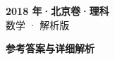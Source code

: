 \documentclass[zihao=-4, a4paper]{ctexart}
\begin{document}
\begin{center}
  {\Large\bfseries 2018 年·北京卷·理科}\\[4pt]
  {\large 数学 · 解析版}
\end{center}
\medskip
{}

\clearpage
{}
\begin{center}{\Large\bfseries 参考答案与详细解析}\end{center}
\medskip

\end{document}
